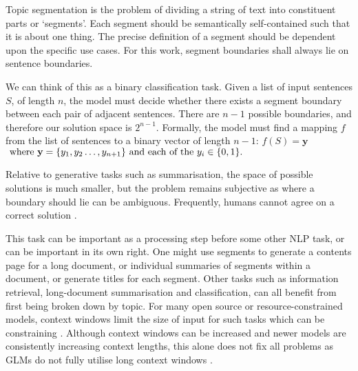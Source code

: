 
Topic segmentation is the problem of dividing a string of text into constituent parts or ‘segments’. Each segment should be semantically self-contained such that it is about one thing. The precise definition of a segment should be dependent upon the specific use cases. For this work, segment boundaries shall always lie on sentence boundaries.

We can think of this as a binary classification task.  Given a list of input sentences $S$, of length $n$, the model must decide whether there exists a segment boundary between each pair of adjacent sentences. There are $n-1$ possible boundaries, and therefore our solution space is $2^{n-1}$.  Formally, the model must find a mapping $f$ from the list of sentences to a binary vector of length $n-1$:
\(
     f(S) = \textbf{y} 
\)
\( \textnormal{ where } \textbf{y}=\{y_1,y_2\ldots,y_{n+1}\} \textnormal{ and each of the } y_i\in\{0,1\}.
\)

Relative to generative tasks such as summarisation, the space of possible solutions is much smaller, but the problem remains subjective as where a boundary should lie can be ambiguous. Frequently, humans cannot agree on a correct solution \cite{TextTiling}.

This task can be important as a processing step before some other NLP task, or can be important in its own right. One might use segments to generate a contents page for a long document, or individual summaries of segments within a document, or generate titles for each segment. Other tasks such as information retrieval, long-document summarisation and classification, can all benefit from first being broken down by topic. For many open source or resource-constrained models, context windows limit the size of input for such tasks which can be constraining \cite{FlanT5}. Although context windows can be increased \cite{ExtendingContextWindows} and newer models are consistently increasing context lengths, this alone does not fix all problems as GLMs do not fully utilise long context windows \cite{EffectOfLongContextWindows} \cite{ContextAffectsFactual}. 

 
